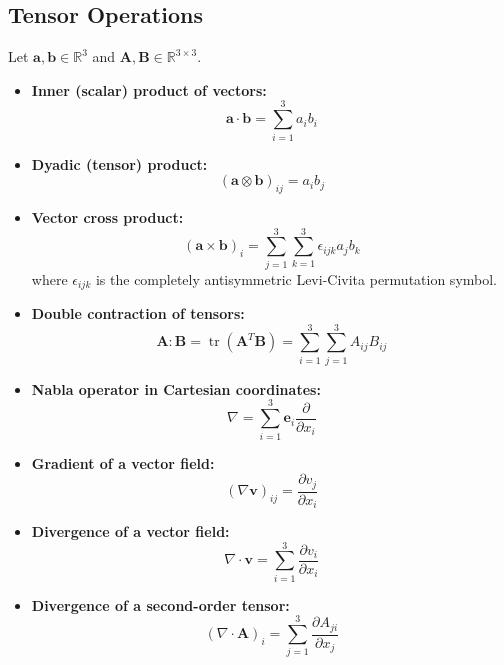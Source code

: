 \documentclass[11pt,a4paper]{article}
\begin{document}
\subsection{Tensor Operations}
Let $\mathbf{a}, \mathbf{b} \in \mathbb{R}^3$ and $\mathbf{A}, \mathbf{B} \in \mathbb{R}^{3 \times 3}$.
\begin{itemize}[leftmargin=*]
    \item \textbf{Inner (scalar) product of vectors:}
    \begin{equation}
    \mathbf{a} \cdot \mathbf{b} = \sum_{i=1}^3 a_i b_i
    \end{equation}
    \item \textbf{Dyadic (tensor) product:}
    \begin{equation}
    (\mathbf{a} \otimes \mathbf{b})_{ij} = a_i b_j
    \end{equation}
    \item \textbf{Vector cross product:}
    \begin{equation}
    (\mathbf{a} \times \mathbf{b})_i = \sum_{j=1}^3 \sum_{k=1}^3 \epsilon_{ijk} a_j b_k
    \end{equation}
    where $\epsilon_{ijk}$ is the completely antisymmetric Levi-Civita permutation symbol.
    \item \textbf{Double contraction of tensors:}
    \begin{equation}
    \mathbf{A} : \mathbf{B} = \operatorname{tr}(\mathbf{A}^T \mathbf{B}) = \sum_{i=1}^3 \sum_{j=1}^3 A_{ij} B_{ij}
    \end{equation}
    \item \textbf{Nabla operator in Cartesian coordinates:}
    \begin{equation}
    \nabla = \sum_{i=1}^3 \mathbf{e}_i \frac{\partial}{\partial x_i}
    \end{equation}
    \item \textbf{Gradient of a vector field:}
    \begin{equation}
    (\nabla \mathbf{v})_{ij} = \frac{\partial v_j}{\partial x_i}
    \end{equation}
    \item \textbf{Divergence of a vector field:}
    \begin{equation}
    \nabla \cdot \mathbf{v} = \sum_{i=1}^3 \frac{\partial v_i}{\partial x_i}
    \end{equation}
    \item \textbf{Divergence of a second-order tensor:}
    \begin{equation}
    (\nabla \cdot \mathbf{A})_i = \sum_{j=1}^3 \frac{\partial A_{ji}}{\partial x_j}

\end{equation}
\end{itemize}
\end{document}
